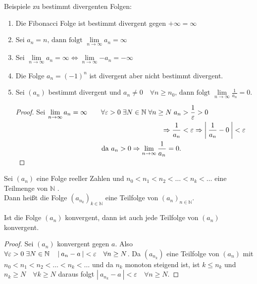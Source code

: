 \documentclass[a4paper,titlepage,oneside]{article}
\def\N{\ensuremath{\mathbb{N}} }
\renewcommand{\epsilon}{\ensuremath{\varepsilon} }
\def\sp{\hspace{0,1cm}}
\renewcommand{\liminf}[2][n]{\ensuremath{\lim\limits_{#1 \rightarrow \infty}{#2}}}
\newcommand{\abs}[1]{\ensuremath{\left|\:#1\:\right|}}
\theoremstyle{thmstyle}
\begin{document}
\begin{subbsp}
Beispiele zu bestimmt divergenten Folgen:
\begin{enumerate}
\item Die Fibonacci Folge ist bestimmt divergent gegen \(+ \infty = \infty \)
\item Sei \(a_n = n\text{, dann folgt }\liminf{a_n} = \infty\)
\item Sei \(\liminf{a_n} = \infty \Leftrightarrow \liminf{-a_n} = - \infty\)
\item Die Folge \(a_n = (-1)^n\) ist divergent aber nicht bestimmt divergent.
\item Sei \((a_n)\) bestimmt divergent und $ \displaystyle a_n \ne 0 \quad \forall n \ge n_0\text{, dann folgt }\liminf{\frac{1}{a_n}} = 0$.
\begin{proof}Sei $ \displaystyle \liminf{a_n} = \infty \quad
\begin{aligned}[t] &&\forall \epsilon > 0 \sp \exists N \in \N \sp \forall n \ge N \sp a_n &> \frac{1}{\epsilon} > 0 \\
&&\Rightarrow \frac{1}{a_n} &< \epsilon \Rightarrow \abs{\frac{1}{a_n} - 0} < \epsilon  \\
&&\text{da } a_n > 0 \Rightarrow \liminf{\frac{1}{a_n}} = 0.
\end{aligned}$\\
\end{proof}
\end{enumerate}
\end{subbsp}

\begin{subdefi}
Sei \((a_n)\) eine Folge reeller Zahlen und \(n_0 < n_1 < n_2 < \dots < n_k < \dots \) eine Teilmenge von \N.\\
Dann heißt die Folge \((a_{n_k})_{k \in \N }\) eine Teilfolge von \((a_n)_{n \in \N}\).
\end{subdefi}

\begin{subbem}
Ist die Folge \((a_n)\) konvergent, dann ist auch jede Teilfolge von \((a_n)\) konvergent.
\begin{proof} Sei $(a_n)$ konvergent gegen $a$. Also $ \forall \epsilon > 0  \sp \exists N \in \N \quad \abs{a_n - a} < \epsilon \quad \forall n \ge N$. Da $(a_{n_k})$ eine Teilfolge von $(a_n)$ mit $n_0 < n_1 < n_2 < \dots < n_k < \dots$ und da $n_k$ monoton steigend ist, ist $k \le n_k$ und $n_k \ge N \quad \forall k \ge N $ daraus folgt $\abs{a_{n_k} - a} < \epsilon \quad \forall n \ge N$.
\end{proof}
\end{subbem}
\end{document}
